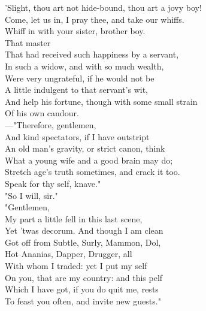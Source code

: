 \documentclass[a4paper,oneside]{memoir}
\begin{document}
\begin{drama*}
\kastrilspeaks 'Slight, thou art not hide-bound, thou art a jovy boy!\\
Come, let us in, I pray thee, and take our whiffs.\\
\lovewitspeaks Whiff in with your sister, brother boy.\\
That master\\
That had received such happiness by a servant,\\
In such a widow, and with so much wealth,\\
Were very ungrateful, if he would not be\\
A little indulgent to that servant's wit,\\
And help his fortune, though with some small strain\\
Of his own candour.\\
---"Therefore, gentlemen,\\
And kind spectators, if I have outstript\\
An old man's gravity, or strict canon, think\\
What a young wife and a good brain may do;\\
Stretch age's truth sometimes, and crack it too.\\
Speak for thy self, knave."\\
\facespeaks {} "So I will, sir."\\
"Gentlemen,\\
My part a little fell in this last scene,\\
Yet 'twas decorum. And though I am clean\\
Got off from Subtle, Surly, Mammon, Dol,\\
Hot Ananias, Dapper, Drugger, all\\
With whom I traded: yet I put my self\\
On you, that are my country: and this pelf\\
Which I have got, if you do quit me, rests\\
To feast you often, and invite new guests."\\

\end{drama*}
\end{document}

